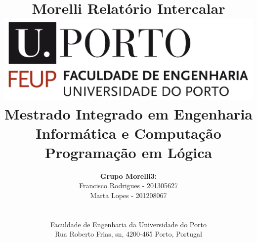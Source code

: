 \documentclass[a4paper]{article}
\begin{document}
\setlength{\textwidth}{16cm}
\setlength{\textheight}{22cm}

\title{\Huge\textbf{Morelli}\linebreak\linebreak\linebreak
\Large\textbf{Relatório Intercalar}\linebreak\linebreak
\linebreak\linebreak
\includegraphics[scale=0.1]{feup-logo.png}\linebreak\linebreak
\linebreak\linebreak
\Large{Mestrado Integrado em Engenharia Informática e Computação} \linebreak\linebreak
\Large{Programação em Lógica}\linebreak
}

\author{\textbf{Grupo Morelli3: }\\
Francisco Rodrigues - 201305627 \\
Marta Lopes - 201208067 \\
\linebreak\linebreak \\
 \\ Faculdade de Engenharia da Universidade do Porto \\ Rua Roberto Frias, s\/n, 4200-465 Porto, Portugal \linebreak\linebreak\linebreak
\linebreak\linebreak\vspace{1cm}}

\maketitle
\end{document}
